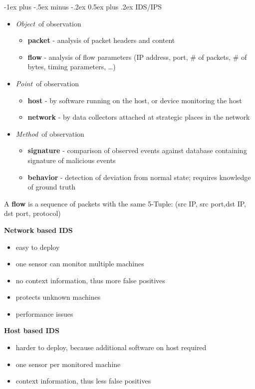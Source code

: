 \documentclass[a4paper,twocolumn]{article}
\makeatletter
\newenvironment{itemization}[1][\small]{%
    \begin{itemize}[leftmargin=*]
            #1
        }{%
    \end{itemize}
}
\newcommand{\half}[3][\scriptsize]{%
    #1
    \begin{minipage}[t]{0.22\textwidth}
        #2
    \end{minipage}
    \hfill
    \vline
    \hfill
    \begin{minipage}[t]{0.22\textwidth}
        #3
    \end{minipage}
}
\renewcommand{\section}{%
    \@startsection{section}{1}{0mm}%
    {-1ex plus -.5ex minus -.2ex}%
    {0.5ex plus .2ex}%
    {\normalfont\normalsize\bfseries\sectionrule{12pt}{0.4pt}{0pt}{0pt}}
}
\makeatother
\begin{document}
\begin{footnotesize}
\section{IDS/IPS}
\begin{itemization}
    \item {\it Object}\ of observation 
        \begin{itemization}
        \item \textbf{packet} - analysis of packet headers and content
        \item \textbf{flow} - analysis of flow parameters (IP address, port, \# of packets, \# of bytes, timing parameters, \ldots)
        \end{itemization}
    \item {\it Point}\ of observation 
        \begin{itemization}
        \item \textbf{host} - by software running on the host, or device monitoring the host
        \item \textbf{network} - by data collectors attached at strategic places in the network
        \end{itemization}
    \item {\it Method}\ of observation 
        \begin{itemization}
        \item \textbf{signature} - comparison of observed events against database containing signature of malicious events
        \item \textbf{behavior} - detection of deviation from normal state; requires knowledge of ground truth
        \end{itemization}
    \end{itemization}
    A \textbf{flow} is a sequence of packets with the same 5-Tuple: (src IP, src port,dst IP, dst port, protocol)

    \half{%
        \textbf{Network based IDS}
        \begin{itemization}[\tiny]
        \item easy to deploy
        \item one sensor can monitor multiple machines
        \item no context information, thus more false positives
        \item protects unknown machines
        \item performance issues
        \end{itemization}
    }{%
        \textbf{Host based IDS}
        \begin{itemization}[\tiny]
        \item harder to deploy, because additional software on host required
        \item one sensor per monitored machine
        \item context information, thus less false positives
        \end{itemization}
    }


\end{footnotesize}
\end{document}

